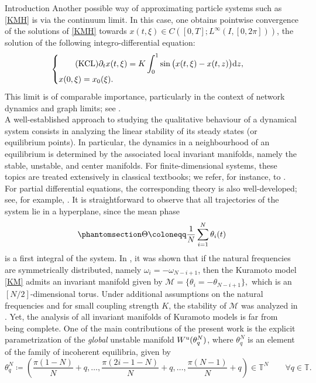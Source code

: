\documentclass{article}
\theoremstyle{definition}
\newcommand{\T}{\mathbb{T}}
\renewcommand{\u}{\textnormal{u}}
\begin{document}
\begin{section}{Introduction}
Another possible way of approximating particle systems such as \eqref{KMH} is via the continuum limit. In this case, one obtains pointwise convergence of the solutions of \eqref{KMH} towards $x(t,\xi)\in C([0,T];L^\infty(I,[0,2\pi]))$, the solution of the following integro-differential equation:
\begin{equation}\label{CL}
\begin{cases}\tag{KCL}
\displaystyle
    \partial_t x(t,\xi)=K\int_0^1 \sin\big(x(t,\xi)-x(t,z)\big)\textnormal{d}z,\\
    x(0,\xi)=x_0(\xi).
\end{cases}
\end{equation}
This limit is of comparable importance, particularly in the context of network dynamics and graph limits; see \cite{medvedev2014nonlinear,medvedev2018continuum,kuehn2019power,gkogkas2021continuum}.\\

A well-established approach to studying the qualitative behaviour of a dynamical system consists in analyzing the linear stability of its steady states (or equilibrium points). In particular, the dynamics in a neighbourhood of an equilibrium is determined by the associated local invariant manifolds, namely the stable, unstable, and center manifolds. For finite-dimensional systems, these topics are treated extensively in classical textbooks; we refer, for instance, to \cite{perko2013differential}. For partial differential equations, the corresponding theory is also well-developed; see, for example, \cite{sell2002dynamics, henry2006geometric, bates1998existence}.
It is straightforward to observe that all trajectories of the system lie in a hyperplane, since the mean phase
\begin{equation}
    \phantomsection
    \Theta\coloneqq\frac{1}{N}\sum_{i=1}^N\theta_i(t)
    \label{mean_phase}
\end{equation}
is a first integral of the system. In \cite{maistrenko2005chaotic,maistrenko2005desynchronization,popovych2005phase}, it was shown that if the natural frequencies are symmetrically distributed, namely $\omega_i=-\omega_{N-i+1}$, then the Kuramoto model \eqref{KM} admits an invariant manifold given by $\mathcal{M}=\{\theta_i=-\theta_{N-i+1}\},$ which is an $[N/2]$-dimensional torus. Under additional assumptions on the natural frequencies and for small coupling strength $K$, the stability of $\mathcal{M}$ was analyzed in \cite{chiba2009stability}. Yet, the analysis of all invariant manifolds of Kuramoto models is far from being complete. One of the main contributions of the present work is the explicit parametrization of the \textit{global} unstable manifold $W^\u(\theta^N_q)$, where $\theta^N_q$ is an element of the family of incoherent equilibria, given by
$$\theta^N_q\coloneqq\left(\frac{\pi(1-N)}{N}+q,\ldots,\frac{\pi(2i-1-N)}{N}+q,\ldots,\frac{\pi(N-1)}{N}+q\right)\in\T^N\qquad \forall q\in\T.$$


\end{section}
\end{document}
